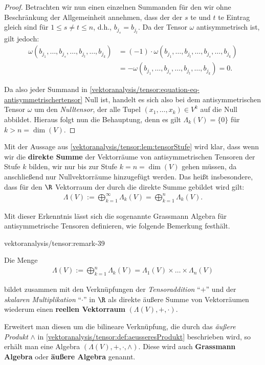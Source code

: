 \documentclass[letterpaper,10pt,english]{jupyterBook}
\begin{document}
\begin{proof}
\par
Betrachten wir nun einen einzelnen Summanden für den wir ohne Beschränkung der Allgemeinheit annehmen, dass der der \(s\) te und \(t\) te Eintrag gleich sind für \(1 \leq s \neq t \leq n\), d.h., \(b_{j_s}=b_{j_t}\).
Da der Tensor \(\omega\) antisymmetrisch ist, gilt jedoch:
\begin{align*}
\omega(b_{j_1}, \ldots, b_{j_s}, \ldots, b_{j_t}, \ldots, b_{j_k}) &= (-1) \cdot \omega(b_{j_1}, \ldots, b_{j_t}, \ldots, b_{j_s}, \ldots, b_{j_k}) \\
&= - \omega(b_{j_1}, \ldots, b_{j_s}, \ldots, b_{j_t}, \ldots, b_{j_k}) = 0.
\end{align*}
\par
Da also jeder Summand in \cref{vektoranalysis/tensor:equation-eq-antisymmetrischertensor} Null ist, handelt es sich also bei dem antisymmetrischen Tensor \(\omega\) um den \emph{Nulltensor}, der alle Tupel \((x_1, \ldots, x_k) \in V^k\) auf die Null abbildet.
Hieraus folgt nun die Behauptung, denn es gilt \(\Lambda_k(V) = \lbrace 0 \rbrace\) für \(k > n =\operatorname{dim}(V)\).
\end{proof}

\par
Mit der Aussage aus \cref{vektoranalysis/tensor:lem:tensorStufe} wird klar, dass wenn wir die \textbf{direkte Summe} der Vektorräume von antisymmetrischen Tensoren der Stufe \(k\) bilden, wir nur bis zur Stufe \(k = n = \operatorname{dim}(V)\) gehen müssen, da anschließend nur Nullvektorräume hinzugefügt werden.
Das heißt insbesondere, dass für den \(\R\) Vektorraum der durch die direkte Summe gebildet wird gilt:
\begin{align*}
\Lambda(V) := \bigoplus_{k=1}^\infty \Lambda_k(V) = \bigoplus_{k=1}^n \Lambda_k(V).
\end{align*}
\par
Mit dieser Erkenntnis lässt sich die sogenannte Grassmann Algebra für antisymmetrische Tensoren definieren, wie folgende Bemerkung festhält.
\begin{remark}{}{vektoranalysis/tensor:remark-39}



\par
Die Menge
\begin{align*}
\Lambda(V) := \bigoplus_{k=1}^n \Lambda_k(V) = \Lambda_1(V) \times \ldots \times \Lambda_n(V)
\end{align*}
\par
bildet zusammen mit den Verknüpfungen der \emph{Tensoraddition} “\(+\)” und der \emph{skalaren Multiplikation} “\(\cdot\)” in \(\R\) als direkte äußere Summe von Vektorräumen wiederum einen \textbf{reellen Vektorraum} \((\Lambda(V), +, \cdot)\).

\par
Erweitert man diesen um die bilineare Verknüpfung, die durch das \emph{äußere Produkt} \(\wedge\) in \cref{vektoranalysis/tensor:def:aeusseresProdukt} beschrieben wird, so erhält man eine Algebra \((\Lambda(V), +, \cdot, \wedge)\).
Diese wird auch \textbf{Grassmann Algebra} oder \textbf{äußere Algebra} genannt.
\end{remark}
\end{document}

